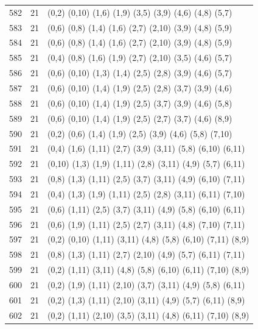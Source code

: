 \begin{appendix}
{\begin{longtable}{lll}
    582& 21 & (0,2)   (0,10)  (1,6)   (1,9)   (3,5)   (3,9)   (4,6)   (4,8)   (5,7)\\
    583& 21 & (0,6)   (0,8)   (1,4)   (1,6)   (2,7)   (2,10)  (3,9)   (4,8)   (5,9)\\
    584& 21 & (0,6)   (0,8)   (1,4)   (1,6)   (2,7)   (2,10)  (3,9)   (4,8)   (5,9)\\
    585& 21 & (0,4)   (0,8)   (1,6)   (1,9)   (2,7)   (2,10)  (3,5)   (4,6)   (5,7)\\
    586& 21 & (0,6)   (0,10)  (1,3)   (1,4)   (2,5)   (2,8)   (3,9)   (4,6)   (5,7)\\
    587& 21 & (0,6)   (0,10)  (1,4)   (1,9)   (2,5)   (2,8)   (3,7)   (3,9)   (4,6)\\
    588& 21 & (0,6)   (0,10)  (1,4)   (1,9)   (2,5)   (3,7)   (3,9)   (4,6)   (5,8)\\
    589& 21 & (0,6)   (0,10)  (1,4)   (1,9)   (2,5)   (2,7)   (3,7)   (4,6)   (8,9)\\
    590& 21 & (0,2)   (0,6)   (1,4)   (1,9)   (2,5)   (3,9)   (4,6)   (5,8)   (7,10)\\
    591& 21 & (0,4)   (1,6)   (1,11)  (2,7)   (3,9)   (3,11)  (5,8)   (6,10)  (6,11)\\
    592& 21 & (0,10)  (1,3)   (1,9)   (1,11)  (2,8)   (3,11)  (4,9)   (5,7)   (6,11)\\
    593& 21 & (0,8)   (1,3)   (1,11)  (2,5)   (3,7)   (3,11)  (4,9)   (6,10)  (7,11)\\
    594& 21 & (0,4)   (1,3)   (1,9)   (1,11)  (2,5)   (2,8)   (3,11)  (6,11)  (7,10)\\
    595& 21 & (0,6)   (1,11)  (2,5)   (3,7)   (3,11)  (4,9)   (5,8)   (6,10)  (6,11)\\
    596& 21 & (0,6)   (1,9)   (1,11)  (2,5)   (2,7)   (3,11)  (4,8)   (7,10)  (7,11)\\
    597& 21 & (0,2)   (0,10)  (1,11)  (3,11)  (4,8)   (5,8)   (6,10)  (7,11)  (8,9)\\
    598& 21 & (0,8)   (1,3)   (1,11)  (2,7)   (2,10)  (4,9)   (5,7)   (6,11)  (7,11)\\
    599& 21 & (0,2)   (1,11)  (3,11)  (4,8)   (5,8)   (6,10)  (6,11)  (7,10)  (8,9)\\
    600& 21 & (0,2)   (1,9)   (1,11)  (2,10)  (3,7)   (3,11)  (4,9)   (5,8)   (6,11)\\
    601& 21 & (0,2)   (1,3)   (1,11)  (2,10)  (3,11)  (4,9)   (5,7)   (6,11)  (8,9)\\
    602& 21 & (0,2)   (1,11)  (2,10)  (3,5)   (3,11)  (4,8)   (6,11)  (7,10)  (8,9)\\

\end{longtable}}
\end{appendix}

